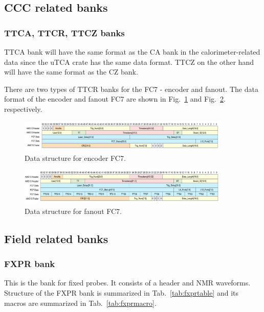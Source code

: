 \subsection{CCC related banks}

\subsubsection*{TTCA, TTCR, TTCZ banks}

TTCA bank will have the same format as the CA bank in the calorimeter-related data since the uTCA crate has the same data format. TTCZ on the other hand will have the same format as the CZ bank.

There are two types of TTCR banks for the FC7 - encoder and fanout. 
The data format of the encoder and fanout FC7 are shown in Fig.~\ref{fig:EncoderFC7} and Fig.~\ref{fig:FanoutFC7}. respectively.

\begin{figure}[htbp]
\centering
\includegraphics[width=0.9\textwidth]{pics/EncoderFC7.pdf} 
\caption{Data structure for encoder FC7.}\label{fig:EncoderFC7}
\end{figure}

\begin{figure}[htbp]
\centering
\includegraphics[width=0.9\textwidth]{pics/FanoutFC7.pdf} 
\caption{Data structure for fanout FC7.}\label{fig:FanoutFC7}
\end{figure}


\subsection{Field related banks}

\subsubsection*{FXPR bank}
This is the bank for fixed probes. It consists of a header and NMR waveforms.
Structure of the FXPR bank is summarized in Tab.~\ref{tab:fxprtable} and its macros are summarized in Tab.~\ref{tab:fxprmacro}.

